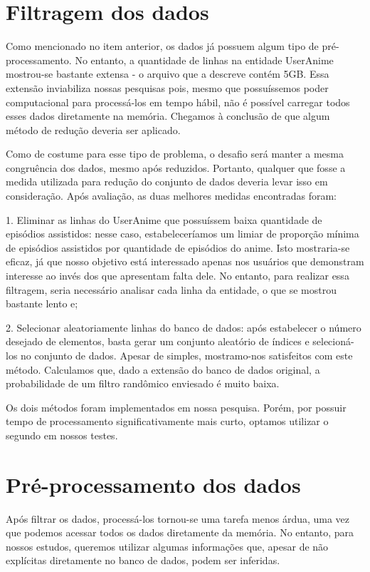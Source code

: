 \documentclass{article}
\begin{document}
\section{Filtragem dos dados}
\quad Como mencionado no item anterior, os dados já possuem algum tipo de pré-processamento. No entanto, a quantidade de linhas na entidade UserAnime mostrou-se bastante extensa - o arquivo que a descreve contém 5GB. Essa extensão inviabiliza nossas pesquisas pois, mesmo que possuíssemos poder computacional para processá-los em tempo hábil, não é possível carregar todos esses dados diretamente na memória. Chegamos à conclusão de que algum método de redução deveria ser aplicado.\par
Como de costume para esse tipo de problema, o desafio será manter a mesma congruência dos dados, mesmo após reduzidos. Portanto, qualquer que fosse a medida utilizada para redução do conjunto de dados deveria levar isso em consideração.
	Após avaliação, as duas melhores medidas encontradas foram:

1. Eliminar as linhas do UserAnime que possuíssem baixa quantidade de episódios assistidos: nesse caso, estabeleceríamos um limiar de proporção mínima de episódios assistidos por quantidade de episódios do anime. Isto mostraria-se eficaz, já que nosso objetivo está interessado apenas nos usuários que demonstram interesse ao invés dos que apresentam falta dele. No entanto, para realizar essa filtragem, seria necessário analisar cada linha da entidade, o que se mostrou bastante lento e;

2. Selecionar aleatoriamente linhas do banco de dados: após estabelecer o número desejado de elementos, basta gerar um conjunto aleatório de índices e selecioná-los no conjunto de dados. Apesar de simples, mostramo-nos satisfeitos com este método. Calculamos que, dado a extensão do banco de dados original, a probabilidade de um filtro randômico enviesado é muito baixa.\par

Os dois métodos foram implementados em nossa pesquisa. Porém, por possuir tempo de processamento significativamente mais curto, optamos utilizar o segundo em nossos testes.

\section{Pré-processamento dos dados}
\quad Após filtrar os dados, processá-los tornou-se uma tarefa menos árdua, uma vez que podemos acessar todos os dados diretamente da memória. No entanto, para nossos estudos, queremos utilizar algumas informações que, apesar de não explícitas diretamente no banco de dados, podem ser inferidas.\par
\end{document}
